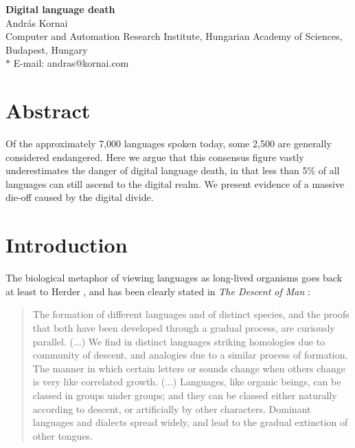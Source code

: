 \documentclass[10pt]{article}
\date{}
\begin{document}
\begin{flushleft}
{\Large
\textbf{Digital language death}
}
\\
Andr\'as Kornai%
\\
Computer and Automation Research Institute, Hungarian Academy of Sciences, Budapest, Hungary\\
$\ast$ E-mail: andras@kornai.com
\end{flushleft}

\section*{Abstract}

Of the approximately 7,000 languages spoken today, some 2,500 are generally
considered endangered. Here we argue that this consensus figure vastly
underestimates the danger of digital language death, in that less than 5\% of
all languages can {\color{black} still ascend to the digital realm}. We present evidence of a
massive die-off caused by the digital divide.


\section*{Introduction}

The biological metaphor of viewing languages as long-lived organisms
goes back at least to Herder \cite{Morpurgo-Davies:1992},  and has been 
clearly stated in {\it The Descent of Man} \cite{Darwin:1871}:

\begin{quote}

The formation of different languages and of distinct species, and
the proofs that both have been developed through a gradual process,
are curiously parallel. (...) We find in
distinct languages striking homologies due to community of descent,
and analogies due to a similar process of formation. The manner in
which certain letters or sounds change when others change is very like
correlated growth. (...) Languages, like organic beings, can
be classed in groups under groups; and they can be classed either
naturally according to descent, or artificially by other characters.
Dominant languages and dialects spread widely, and lead to the gradual
extinction of other tongues. 

\end{quote} 
 
\end{document}
